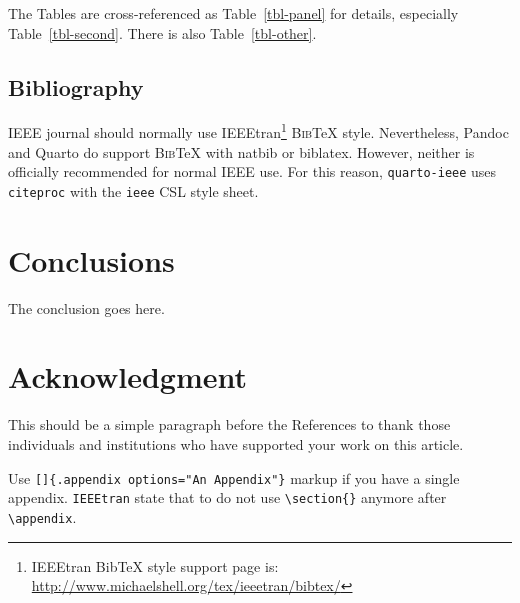 \documentclass[
  journal,
]{IEEEtran}%
\begin{document}
The Tables are cross-referenced as Table~\ref{tbl-panel} for details,
especially Table~\ref{tbl-second}. There is also Table~\ref{tbl-other}.

\begin{table}

\caption{\label{tbl-other}A table}


\end{table}%

\subsection{Bibliography}\label{bibliography}

IEEE journal should normally use IEEEtran\footnote{IEEEtran BibTeX style
  support page is:
  \url{http://www.michaelshell.org/tex/ieeetran/bibtex/}}
\textsc{Bib}{\TeX} style. Nevertheless, Pandoc and Quarto do support
\textsc{Bib}{\TeX} with natbib or biblatex. However, neither is
officially recommended for normal IEEE use. For this reason,
\texttt{quarto-ieee} uses \texttt{citeproc} with the \texttt{ieee} CSL
style sheet.

\section{Conclusions}\label{conclusions}

The conclusion goes here.

\section*{Acknowledgment}\label{acknowledgment}

This should be a simple paragraph before the References to thank those
individuals and institutions who have supported your work on this
article.

\appendix[An Appendix]{}

Use \texttt{{[}{]}\{.appendix\ options="An\ Appendix"\}} markup if you
have a single appendix. \texttt{IEEEtran} state that to do not use
\texttt{\textbackslash{}section\{\}} anymore after
\texttt{\textbackslash{}appendix}.
\end{document}
